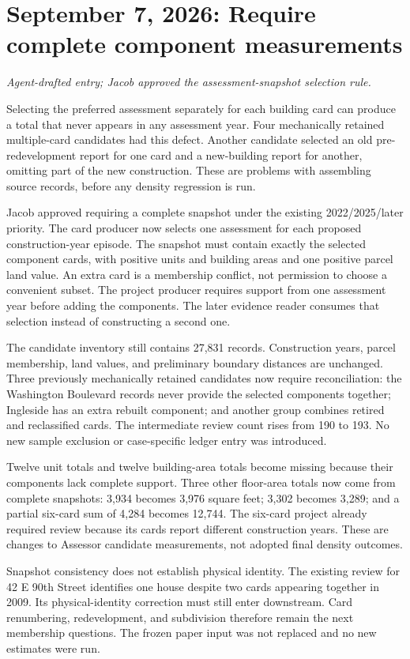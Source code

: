 \section*{September 7, 2026: Require complete component measurements}
\textit{Agent-drafted entry; Jacob approved the assessment-snapshot selection rule.}

Selecting the preferred assessment separately for each building card can produce
a total that never appears in any assessment year. Four mechanically retained
multiple-card candidates had this defect. Another candidate selected an old
pre-redevelopment report for one card and a new-building report for another,
omitting part of the new construction. These are problems with assembling source
records, before any density regression is run.

Jacob approved requiring a complete snapshot under the existing 2022/2025/later
priority. The card producer now selects one assessment for each proposed
construction-year episode. The snapshot must contain exactly the selected
component cards, with positive units and building areas and one positive parcel
land value. An extra card is a membership conflict, not permission to choose a
convenient subset. The project producer requires support from one assessment year
before adding the components. The later evidence reader consumes that selection
instead of constructing a second one.

The candidate inventory still contains 27,831 records. Construction years, parcel
membership, land values, and preliminary boundary distances are unchanged. Three
previously mechanically retained candidates now require reconciliation: the
Washington Boulevard records never provide the selected components together;
Ingleside has an extra rebuilt component; and another group combines retired and
reclassified cards. The intermediate review count rises from 190 to 193.
No new sample exclusion or case-specific ledger entry was introduced.

Twelve unit totals and twelve building-area totals become missing because their
components lack complete support. Three other floor-area totals now come from
complete snapshots: 3,934 becomes 3,976 square feet; 3,302 becomes 3,289; and a
partial six-card sum of 4,284 becomes 12,744. The six-card project already required
review because its cards report different construction years. These are changes
to Assessor candidate measurements, not adopted final density outcomes.

Snapshot consistency does not establish physical identity. The existing review
for 42 E 90th Street identifies one house despite two cards appearing together
in 2009. Its physical-identity correction must still enter downstream. Card
renumbering, redevelopment, and subdivision therefore remain the next membership
questions. The frozen paper input was not replaced and no new estimates were run.

